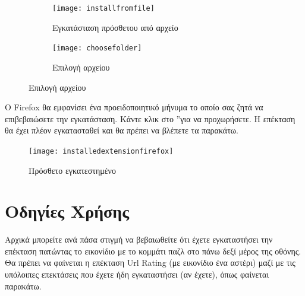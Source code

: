 \documentclass{article}
\begin{document}
\begin{figure}[H]
    \centering
    \begin{minipage}[t]{0.45\textwidth}
        \centering
        \begin{subfigure}[t]{\textwidth}
            \texttt{[image: installfromfile]}
        \caption{Eγκατάσταση πρόσθετου από αρχείο}
        \label{Fig:installfromfile}
        \end{subfigure}
        \vspace{\fill}
    \end{minipage}
    \hfill
    \begin{minipage}{0.45\textwidth}
        \begin{subfigure}{\textwidth}
            \texttt{[image: choosefolder]}
            \caption{Επιλογή αρχείου}
            \label{Fig:choosefile}
        \end{subfigure}
    \end{minipage}
\end{figure}

Ο Firefox θα εμφανίσει ένα προειδοποιητικό μήνυμα το οποίο σας ζητά να επιβεβαιώσετε την εγκατάσταση. Κάντε κλικ στο \textquotedblright για να προχωρήσετε. Η επέκταση θα έχει πλέον εγκατασταθεί και θα πρέπει να βλέπετε τα παρακάτω.

\begin{figure}[H]
    \texttt{[image: installedextensionfirefox]}
    \caption*{Πρόσθετο εγκατεστημένο}
\end{figure}

\section*{Οδηγίες Χρήσης}

Αρχικά μπορείτε ανά πάσα στιγμή να βεβαιωθείτε ότι έχετε εγκαταστήσει την επέκταση πατώντας το εικονίδιο με το κομμάτι παζλ στο πάνω δεξί μέρος της οθόνης. Θα πρέπει να φαίνεται η επέκταση Url Rating (με εικονίδιο ένα αστέρι) μαζί με τις υπόλοιπες επεκτάσεις που έχετε ήδη εγκαταστήσει (αν έχετε), όπως φαίνεται παρακάτω.
\end{document}
